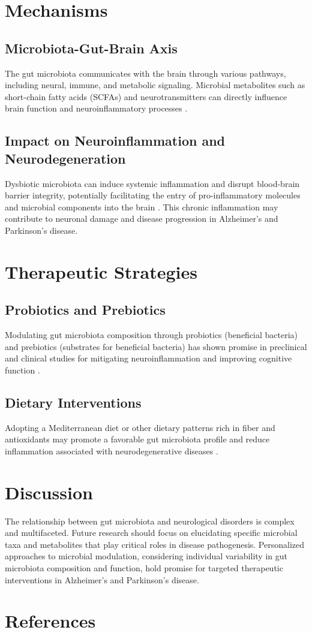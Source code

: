 \documentclass[12pt]{article}
\begin{document}
\section{Mechanisms}
\subsection{Microbiota-Gut-Brain Axis}
The gut microbiota communicates with the brain through various pathways, including neural, immune, and metabolic signaling. Microbial metabolites such as short-chain fatty acids (SCFAs) and neurotransmitters can directly influence brain function and neuroinflammatory processes \citep{sherwin2018role, mayer2019gut}.

\subsection{Impact on Neuroinflammation and Neurodegeneration}
Dysbiotic microbiota can induce systemic inflammation and disrupt blood-brain barrier integrity, potentially facilitating the entry of pro-inflammatory molecules and microbial components into the brain \citep{bonaz2018microbiota, sampson2016gut}. This chronic inflammation may contribute to neuronal damage and disease progression in Alzheimer's and Parkinson's disease.

\section{Therapeutic Strategies}
\subsection{Probiotics and Prebiotics}
Modulating gut microbiota composition through probiotics (beneficial bacteria) and prebiotics (substrates for beneficial bacteria) has shown promise in preclinical and clinical studies for mitigating neuroinflammation and improving cognitive function \citep{distrutti2019gut, agarwal2020probiotics}.

\subsection{Dietary Interventions}
Adopting a Mediterranean diet or other dietary patterns rich in fiber and antioxidants may promote a favorable gut microbiota profile and reduce inflammation associated with neurodegenerative diseases \citep{hill2019gut, cao2020dietary}.

\section{Discussion}
The relationship between gut microbiota and neurological disorders is complex and multifaceted. Future research should focus on elucidating specific microbial taxa and metabolites that play critical roles in disease pathogenesis. Personalized approaches to microbial modulation, considering individual variability in gut microbiota composition and function, hold promise for targeted therapeutic interventions in Alzheimer's and Parkinson's disease.

\section*{References}


\end{document}
